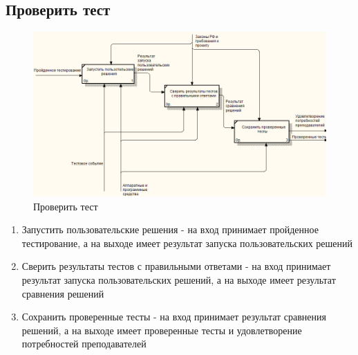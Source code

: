     \subsection{Проверить тест}
    \begin{figure}[H]
        \includegraphics[width=\textwidth, center]{../img/idef0/ValidateTestDecompose.png}
        \caption{Проверить тест}
    \end{figure}

    \begin{enumerate}
        \item Запустить пользовательские решения - на вход принимает пройденное тестирование,
        а на выходе имеет результат запуска пользовательских решений
        \item Сверить результаты тестов с правильными ответами - на вход принимает 
        результат запуска пользовательских решений, а на выходе имеет результат сравнения 
        решений
        \item Сохранить проверенные тесты - на вход принимает результат сравнения
        решений, а на выходе имеет проверенные тесты и удовлетворение потребностей
        преподавателей
    \end{enumerate}